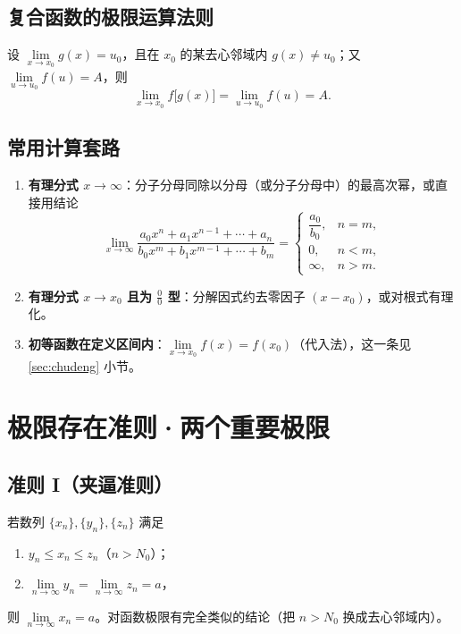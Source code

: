 
\subsection{复合函数的极限运算法则}
设 $\lim\limits_{x\to x_0}g(x)=u_0$，且在 $x_0$ 的某去心邻域内 $g(x)\neq u_0$；又 $\lim\limits_{u\to u_0}f(u)=A$，则
\[
\lim_{x\to x_0}f\bigl[g(x)\bigr]=\lim_{u\to u_0}f(u)=A .
\]

\subsection{常用计算套路}
\begin{enumerate}
    \item \textbf{有理分式 $x\to\infty$}：分子分母同除以分母（或分子分母中）的最高次幂，或直接用结论
\[
\lim_{x\to\infty}\frac{a_0x^n+a_1x^{n-1}+\cdots+a_n}{b_0x^m+b_1x^{m-1}+\cdots+b_m}=
\begin{cases}
\dfrac{a_0}{b_0}, & n=m,\\[2mm]
0, & n<m,\\[2mm]
\infty, & n>m .
\end{cases}
\]
    \item \textbf{有理分式 $x\to x_0$ 且为 $\frac00$ 型}：分解因式约去零因子 $(x-x_0)$，或对根式有理化。
    \item \textbf{初等函数在定义区间内}：$\lim\limits_{x\to x_0}f(x)=f(x_0)$（代入法），这一条见 \ref{sec:chudeng} 小节。
\end{enumerate}

\section{\texorpdfstring{极限存在准则·两个重要极限}{极限存在准则 两个重要极限}}

\subsection{准则 I（夹逼准则）}
若数列 $\{x_n\},\{y_n\},\{z_n\}$ 满足
\begin{enumerate}
    \item $y_n\le x_n\le z_n$\quad（$n>N_0$）；
    \item $\lim\limits_{n\to\infty}y_n=\lim\limits_{n\to\infty}z_n=a$，
\end{enumerate}
则 $\lim\limits_{n\to\infty}x_n=a$。对函数极限有完全类似的结论（把 $n>N_0$ 换成去心邻域内）。

